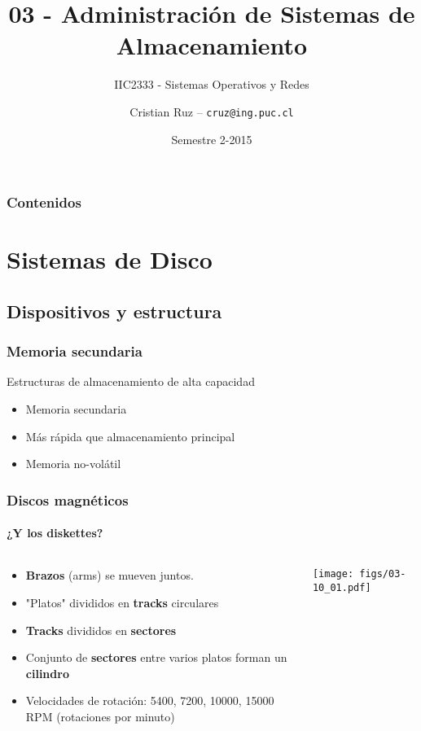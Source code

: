 \documentclass[letter]{beamer}
\title[IIC2333] %
{03 - Administración de Sistemas de Almacenamiento}
\subtitle{IIC2333 - Sistemas Operativos y Redes}
\author[C.Ruz] %
{Cristian Ruz -- {\tt cruz@ing.puc.cl} }
\institute[PUC] %
{
  Departamento de Ciencia de la Computación\\
  Pontificia Universidad Católica de Chile
}
\date[2/2015] %
{Semestre 2-2015}
\begin{document}
\frame{\titlepage}

\begin{frame}
\frametitle{Contenidos}
\tableofcontents
\end{frame}


\section{Sistemas de Disco}

\subsection{Dispositivos y estructura}

\begin{frame}
  \frametitle{Memoria secundaria}
  Estructuras de almacenamiento de alta capacidad

  \begin{itemize}
    \item Memoria secundaria
    \item Más rápida que almacenamiento principal
    \item Memoria no-volátil
  \end{itemize}

\end{frame}

\begin{frame}
  \frametitle{Discos magnéticos}
  \framesubtitle{¿Y los diskettes?}

  \begin{columns}[c]
    \begin{column}[T]{7cm}
      \begin{itemize}
        \item {\bf Brazos} (arms) se mueven juntos.
        \item "Platos" divididos en {\bf tracks} circulares
        \item {\bf Tracks} divididos en {\bf sectores}
        \item Conjunto de {\bf sectores} entre varios platos
              forman un {\bf cilindro}
        \item Velocidades de rotación: 5400, 7200, 10000, 15000 RPM (rotaciones por minuto)
      \end{itemize}
    \end{column}
    
    \begin{column}[T]{5cm}
      \begin{center}
        \texttt{[image: figs/03-10\_01.pdf]}
      \end{center}
    \end{column}
  \end{columns}

\end{frame}
\end{document}

